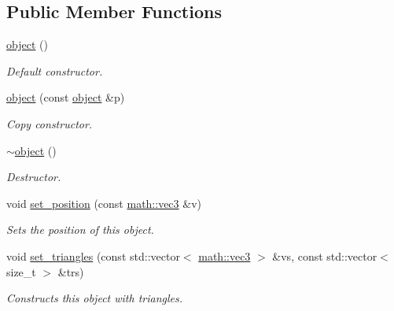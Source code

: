 \subsection*{Public Member Functions}
\begin{DoxyCompactItemize}
\item 
\mbox{\label{classphysim_1_1geometry_1_1object_adc2dc73ddbc6f85591899bb63a8cea53}} 
\hyperlink{classphysim_1_1geometry_1_1object_adc2dc73ddbc6f85591899bb63a8cea53}{object} ()
\begin{DoxyCompactList}\small\item\em Default constructor. \end{DoxyCompactList}\item 
\mbox{\label{classphysim_1_1geometry_1_1object_ac349129f294cb2c992c180e3f0f2ced5}} 
\hyperlink{classphysim_1_1geometry_1_1object_ac349129f294cb2c992c180e3f0f2ced5}{object} (const \hyperlink{classphysim_1_1geometry_1_1object}{object} \&p)
\begin{DoxyCompactList}\small\item\em Copy constructor. \end{DoxyCompactList}\item 
\mbox{\label{classphysim_1_1geometry_1_1object_aa85f6ae6e15fbdabd27d71b8dc4aa661}} 
\hyperlink{classphysim_1_1geometry_1_1object_aa85f6ae6e15fbdabd27d71b8dc4aa661}{$\sim$object} ()
\begin{DoxyCompactList}\small\item\em Destructor. \end{DoxyCompactList}\item 
void \hyperlink{classphysim_1_1geometry_1_1object_a45f72ec911732fc475c9264386626cfe}{set\+\_\+position} (const \hyperlink{structphysim_1_1math_1_1vec3}{math\+::vec3} \&v)
\begin{DoxyCompactList}\small\item\em Sets the position of this object. \end{DoxyCompactList}\item 
void \hyperlink{classphysim_1_1geometry_1_1object_a878847079d75d63f84ee0a515ee9b199}{set\+\_\+triangles} (const std\+::vector$<$ \hyperlink{structphysim_1_1math_1_1vec3}{math\+::vec3} $>$ \&vs, const std\+::vector$<$ size\+\_\+t $>$ \&trs)
\begin{DoxyCompactList}\small\item\em Constructs this object with triangles. \end{DoxyCompactList}\item 

\end{DoxyCompactItemize}
